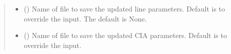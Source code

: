 \documentclass[letterpaper,10pt,english]{sphinxmanual}
\begin{document}
\begin{fulllineitems}
\begin{fulllineitems}
\begin{quote}
\begin{description}
\begin{itemize}
\item {} 
\sphinxAtStartPar
{} (\sphinxstyleliteralemphasis{\sphinxupquote{, }}) \textendash{} Name of file to save the updated line parameters. Default is to override the input. The default is None.

\item {} 
\sphinxAtStartPar
{} (\sphinxstyleliteralemphasis{\sphinxupquote{, }}) \textendash{} Name of file to save the updated CIA parameters.  Default is to override the input.

\end{itemize}

\end{description}\end{quote}

\end{fulllineitems}


\end{fulllineitems}

\end{document}
